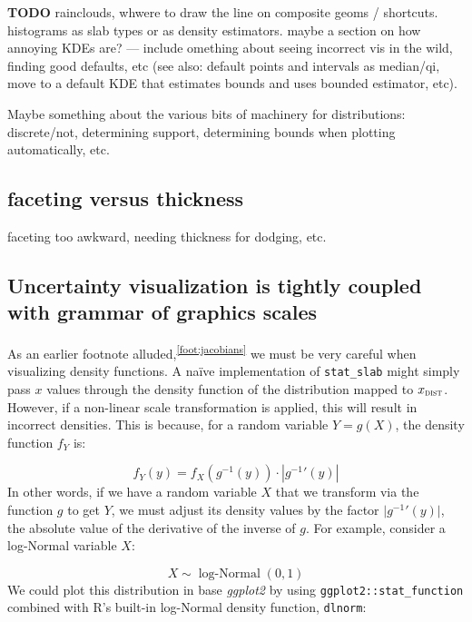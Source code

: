\documentclass[journal]{vgtc}                     %
\begin{document}
\textbf{TODO} rainclouds, whwere to draw the line on composite geoms / shortcuts. histograms as slab types or as density estimators. maybe a section on how annoying KDEs are? --- include omething about seeing incorrect vis in the wild, finding good defaults, etc (see also: default points and intervals as median/qi, move to a default KDE that estimates bounds and uses bounded estimator, etc).

Maybe something about the various bits of machinery for distributions: discrete/not, determining support, determining bounds when plotting automatically, etc.

\subsection{faceting versus thickness}

faceting too awkward, needing thickness for dodging, etc.

\subsection{Uncertainty visualization is tightly coupled with grammar of graphics scales}
\label{sec:jacobians}

As an earlier footnote alluded,\textsuperscript{\ref{foot:jacobians}}   we must be very careful when visualizing density functions. A na\"{i}ve implementation of \texttt{stat\_slab} might simply pass $x$ values through the density function of the distribution mapped to $x_\textsc{dist}$. However, if a non-linear scale transformation is applied, this will result in incorrect densities. This is because, for a random variable $Y = g(X)$, the density function $f_Y$ is:

\[
f_Y(y) = f_X\left(g^{-1}(y)\right) \cdot \left| {g^{-1}}'(y) \right|
\]
In other words, if we have a random variable $X$ that we transform via the function $g$ to get $Y$, we must adjust its density values by the factor $\lvert {g^{-1}}'(y) \rvert$, the absolute value of the derivative of the inverse of $g$. For example, consider a log-Normal variable $X$:

\[
X \sim \operatorname{log-Normal}(0, 1)
\]
We could plot this distribution in base \textit{ggplot2} by using \texttt{ggplot2::stat\_function} combined with R's built-in log-Normal density function, \texttt{dlnorm}:
\end{document}
